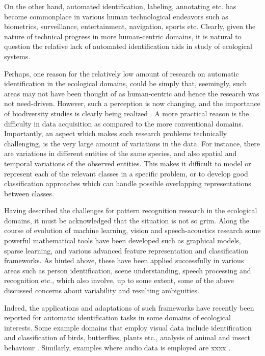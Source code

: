 \documentclass{article}
\begin{document}
On the other hand, automated identification, labeling, annotating etc. has become commonplace in various human technological endeavors such as biometrics, surveillance, entertainment, navigation, sports etc. Clearly, given the nature of technical progress in more human-centric domains, it is natural to question the relative lack of automated identification aids in study of ecological systems. 

Perhaps, one reason for the relatively low amount of research on automatic identification in the ecological domains, could be simply that, seemingly, such areas may not have been thought of as human-centric and hence the research was not need-driven. However, such a perception is now changing, and the importance of biodiversity studies is clearly being realized \cite{}. A more practical reason is the difficulty in data acquisition as compared to the more conventional domains. Importantly, an aspect which makes such research problems technically challenging, is the very large amount of variations in the data. For instance, there are variations in different entities of the same species, and also spatial and temporal variations of the observed entities. This makes it difficult to model or represent each of the relevant classes in a specific problem, or to develop good classification approaches which can handle possible overlapping representations between classes.

Having described the challenges for pattern recognition research in the ecological domains, it must be acknowledged that the situation is not so grim. Along the course of evolution of machine learning, vision and speech-acoustics research some powerful mathematical tools have been developed such as graphical models, sparse learning, and various advanced feature representation and classification frameworks. 
As hinted above, these have been applied successfully in various areas such as person identification, scene understanding, speech processing and recognition etc., which also involve, up to some extent, some of the above discussed concerns about variability and resulting ambiguities. 

Indeed, the applications and adaptations of such frameworks have recently been reported for automatic identification tasks in some domains of ecological interests. Some example domains that employ visual data include identification and classification of birds, butterflies, plants etc., analysis of animal and insect behaviour \cite{leaf,butterfly,hierarchy,poof}. Similarly, examples where audio data is employed are xxxx \cite{}.
\end{document}
